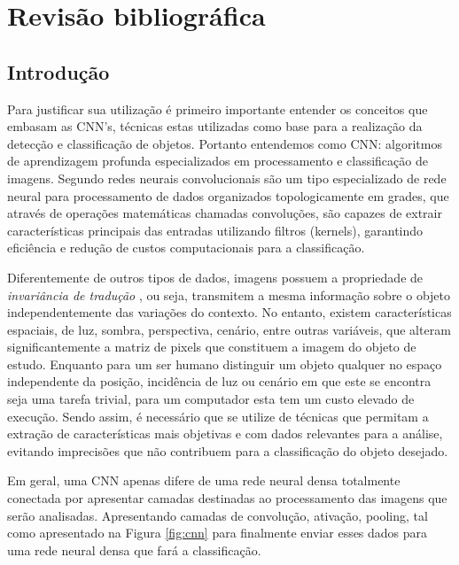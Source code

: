 \documentclass[12pt]{article}
\begin{document}
\section{Revisão bibliográfica}

\subsection{Introdução}
Para justificar sua utilização é primeiro importante entender os conceitos que embasam as CNN's, técnicas estas utilizadas como base para  a realização da detecção e classificação de objetos. Portanto entendemos como CNN: algoritmos de aprendizagem profunda especializados em processamento e classificação de imagens. Segundo \cite{Goodfellow-et-al-2016} redes neurais convolucionais são um tipo especializado de rede neural para processamento de dados organizados topologicamente em grades, que através de operações matemáticas chamadas convoluções, são capazes de extrair características principais das entradas utilizando filtros (kernels), garantindo eficiência e redução de custos computacionais para a classificação.

Diferentemente de outros tipos de dados, imagens possuem a propriedade de {\it invariância de tradução} \cite{Aggarwal18}, ou seja, transmitem a mesma informação sobre o objeto independentemente das variações do contexto. No entanto, existem características espaciais, de luz, sombra, perspectiva, cenário, entre outras variáveis, que alteram significantemente a matriz de pixels que constituem a imagem do objeto de estudo. Enquanto para um ser humano distinguir um objeto qualquer no espaço independente da posição, incidência de luz ou cenário em que este se encontra seja uma tarefa trivial, para um computador esta tem um custo elevado de execução. Sendo assim, é necessário que se utilize de técnicas que permitam a extração de características mais objetivas e com dados relevantes para a análise, evitando imprecisões que não contribuem para a classificação do objeto desejado.

Em geral, uma CNN apenas difere de uma rede neural densa totalmente conectada por apresentar camadas destinadas ao processamento das imagens que serão analisadas. Apresentando camadas de convolução, ativação, pooling, tal como apresentado na Figura \ref{fig:cnn} para finalmente enviar esses dados para uma rede neural densa que fará a classificação.
\end{document}
